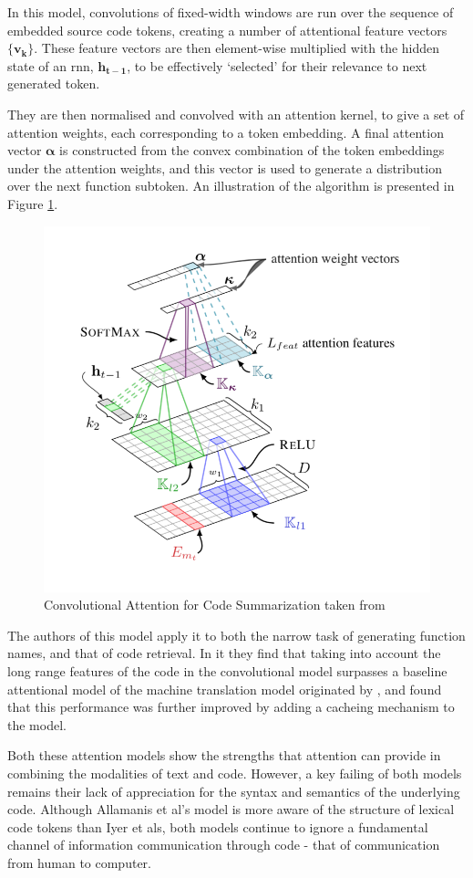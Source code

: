 In this model, convolutions of fixed-width windows are run over the sequence of embedded source code tokens, creating a number of attentional feature vectors $\mathbf{\{v_k\}}$.
These feature vectors are then element-wise multiplied with the hidden state of an rnn, $\mathbf{h_{t-1}}$, to be effectively `selected' for their relevance to next generated token. 

They are then normalised and convolved with an attention kernel, to give a set of attention weights, each corresponding to a token embedding. 
A final attention vector $\mathbf{\alpha}$ is constructed from the convex combination of the token embeddings under the attention weights, and this vector is used to generate a distribution over the next function subtoken.
An illustration of the algorithm is presented in Figure \ref{fig:allamanis_conv}.

\begin{figure}[h]
    \centering
    \includegraphics[width=0.6\linewidth]{ModelPics/allamanis_etal.png}
    \caption{Convolutional Attention for Code Summarization taken from \citet{allamanis_convolutional_2016}  }
    \label{fig:allamanis_conv}
\end{figure}

The authors of this model apply it to both the narrow task of generating function names, and that of code retrieval. In it they find that taking into account the long range features of the code in the convolutional model surpasses a baseline attentional model of the machine translation model originated by \citet{bahdanau_neural_2014}, and found that this performance was further improved by adding a cacheing mechanism to the model.

Both these attention models show the strengths that attention can provide in combining the modalities of text and code. However, a key failing of both models remains their lack of appreciation for the syntax and semantics of the underlying code.
Although Allamanis et al's model is more aware of the structure of lexical code tokens than Iyer et als, both models continue to ignore a fundamental channel of information communication through code - that of communication from human to computer.

